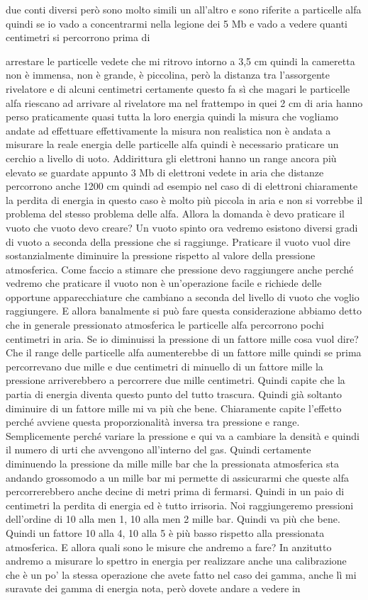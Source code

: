 due conti diversi però sono molto simili un all'altro e sono riferite a particelle alfa quindi se io vado a concentrarmi nella legione dei 5 Mb e vado a vedere quanti centimetri si percorrono prima di 

arrestare le particelle vedete che mi ritrovo intorno a 3,5 cm quindi la cameretta non è immensa, non è grande, è piccolina, però la distanza tra l'assorgente rivelatore e di alcuni centimetri certamente questo fa sì che magari le particelle alfa riescano ad arrivare al rivelatore ma nel frattempo in quei 2 cm di aria hanno perso praticamente quasi tutta la loro energia quindi la misura che vogliamo andate ad effettuare effettivamente la misura non realistica non è andata a misurare la reale energia delle particelle alfa quindi è necessario praticare un cerchio a livello di uoto. Addirittura gli elettroni hanno un range ancora più elevato se guardate appunto 3 Mb di elettroni vedete in aria che distanze percorrono anche 1200 cm quindi ad esempio nel caso di di elettroni chiaramente la perdita di energia in questo caso è molto più piccola in aria e non si vorrebbe il problema del stesso problema delle alfa. Allora la domanda è devo praticare il vuoto che vuoto devo creare? Un vuoto spinto ora vedremo esistono diversi gradi di vuoto a seconda della pressione che si raggiunge. Praticare il vuoto vuol dire sostanzialmente diminuire la pressione rispetto al valore della pressione atmosferica. Come faccio a stimare che pressione devo raggiungere anche perché vedremo che praticare il vuoto non è un'operazione facile e richiede delle opportune apparecchiature che cambiano a seconda del livello di vuoto che voglio raggiungere. E allora banalmente si può fare questa considerazione abbiamo detto che in generale pressionato atmosferica le particelle alfa percorrono pochi centimetri in aria. Se io diminuissi la pressione di un fattore mille cosa vuol dire? Che il range delle particelle alfa aumenterebbe di un fattore mille quindi se prima percorrevano due mille e due centimetri di minuello di un fattore mille la pressione arriverebbero a percorrere due mille centimetri. Quindi capite che la partia di energia diventa questo punto del tutto trascura. Quindi già soltanto diminuire di un fattore mille mi va più che bene. Chiaramente capite l'effetto perché avviene questa proporzionalità inversa tra pressione e range. Semplicemente perché variare la pressione e qui va a cambiare la densità e quindi il numero di urti che avvengono all'interno del gas. Quindi certamente diminuendo la pressione da mille mille bar che la pressionata atmosferica sta andando grossomodo a un mille bar mi permette di assicurarmi che queste alfa percorrerebbero anche decine di metri prima di fermarsi. Quindi in un paio di centimetri la perdita di energia ed è tutto irrisoria. Noi raggiungeremo pressioni dell'ordine di 10 alla men 1, 10 alla men 2 mille bar. Quindi va più che bene. Quindi un fattore 10 alla 4, 10 alla 5 è più basso rispetto alla pressionata atmosferica. E allora quali sono le misure che andremo a fare? In anzitutto andremo a misurare lo spettro in energia per realizzare anche una calibrazione che è un po' la stessa operazione che avete fatto nel caso dei gamma, anche lì mi suravate dei gamma di energia nota, però dovete andare a vedere in 